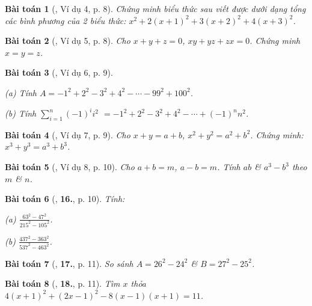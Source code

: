 \documentclass{article}
\numberwithin{equation}{section}
\newtheorem{baitoan}{Bài toán}[section]
\begin{document}
\begin{baitoan}[\cite{Binh_Toan_8_tap_1}, Ví dụ 4, p. 8]
	Chứng minh biểu thức sau viết được dưới dạng tổng các bình phương của 2 biểu thức: $x^2 + 2(x + 1)^2 + 3(x + 2)^2 + 4(x + 3)^2$.
\end{baitoan}

\begin{baitoan}[\cite{Binh_Toan_8_tap_1}, Ví dụ 5, p. 8]
	Cho $x + y + z = 0$, $xy + yz + zx = 0$. Chứng minh $x = y = z$.
\end{baitoan}

\begin{baitoan}[\cite{Binh_Toan_8_tap_1}, Ví dụ 6, p. 9]
	\begin{enumerate*}
		\item[(a)] Tính $A = -1^2 + 2^2 - 3^2 + 4^2 - \cdots - 99^2 + 100^2$.
		\item[(b)] Tính $\sum_{i=1}^n (-1)^ii^2$ $= -1^2 + 2^2 - 3^2 + 4^2 - \cdots + (-1)^nn^2$.
	\end{enumerate*}
\end{baitoan}

\begin{baitoan}[\cite{Binh_Toan_8_tap_1}, Ví dụ 7, p. 9]
	Cho $x + y = a + b$, $x^2 + y^2 = a^2 + b^2$. Chứng minh: $x^3 + y^3 = a^3 + b^3$.
\end{baitoan}

\begin{baitoan}[\cite{Binh_Toan_8_tap_1}, Ví dụ 8, p. 10]
	Cho $a + b = m$, $a - b = m$. Tính $ab$ \& $a^3 - b^3$ theo $m$ \& $n$.
\end{baitoan}

\begin{baitoan}[\cite{Binh_Toan_8_tap_1}, \textbf{16.}, p. 10]
	Tính:
	\begin{enumerate*}
		\item[(a)] $\frac{63^2 - 47^2}{215^2 - 105^2}$.
		\item[(b)] $\frac{437^2 - 363^2}{537^2 - 463^2}$.
	\end{enumerate*}
\end{baitoan}

\begin{baitoan}[\cite{Binh_Toan_8_tap_1}, \textbf{17.}, p. 11]
	So sánh $A = 26^2 - 24^2$ \& $B = 27^2 - 25^2$.
\end{baitoan}

\begin{baitoan}[\cite{Binh_Toan_8_tap_1}, \textbf{18.}, p. 11]
	Tìm $x$ thỏa $4(x + 1)^2 + (2x - 1)^2 - 8(x - 1)(x + 1) = 11$.
\end{baitoan}
\end{document}
